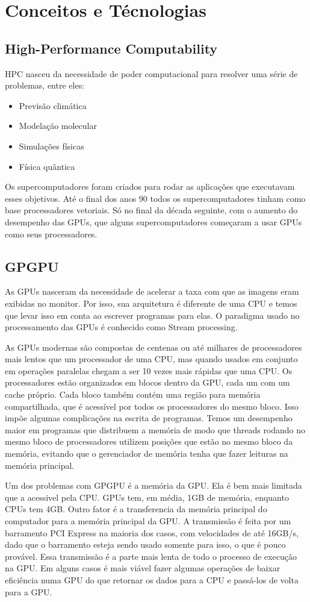 \section{Conceitos e Técnologias}
\subsection{High-Performance Computability}
HPC nasceu da necessidade de poder computacional para resolver uma série de problemas, entre eles:
\begin{itemize}
  \item Previsão climática
  \item Modelação molecular
  \item Simulações físicas
  \item Física quântica
\end{itemize}
Os supercomputadores foram criados para rodar as aplicações que executavam esses objetivos. Até o final
dos anos 90 todos os supercomputadores tinham como base processadores vetoriais. Só no final da década seguinte, 
com o aumento do desempenho das GPUs, que alguns supercomputadores começaram a usar GPUs como seus processadores.
\subsection{GPGPU}
As GPUs nasceram da necessidade de acelerar a taxa com que as imagens eram exibidas no monitor. Por isso, sua arquitetura
é diferente de uma CPU e temos que levar isso em conta ao escrever programas para elas. O paradigma usado no processamento
das GPUs é conhecido como Stream processing.

As GPUs modernas são compostas de centenas ou até milhares de processadores mais lentos que um processador de uma CPU,
mas quando usados em conjunto em operações paralelas chegam a ser 10 vezes mais rápidas que uma CPU. Os processadores
estão organizados em blocos dentro da GPU, cada um com um cache próprio.
Cada bloco também contém uma região para memória compartilhada, que é acessível
por todos os processadores do mesmo bloco. Isso impõe algumas complicações na escrita de programas. Temos um desempenho
maior em programas que distribuem a memória de modo que threads rodando no mesmo bloco de processadores utilizem posições
que estão no mesmo bloco da memória, evitando que o gerenciador de memória tenha que fazer leituras na memória principal.

Um dos problemas com GPGPU é a memória da GPU. Ela é bem mais limitada que a acessivel pela CPU. GPUs tem, em média, 1GB
de memória, enquanto CPUs tem 4GB. Outro fator é a transferencia da memória principal do computador para a memória principal
da GPU. A transmissão é feita por um barramento PCI Express na maioria dos casos, com velocidades de até 16GB/s, dado que o
barramento esteja sendo usado somente para isso, o que é pouco provável. Essa transmissão é a parte mais lenta de todo o
processo de execução na GPU. Em alguns casos é mais viável fazer algumas operações de baixar eficiência numa GPU do que
retornar os dados para a CPU e passá-los de volta para a GPU.

